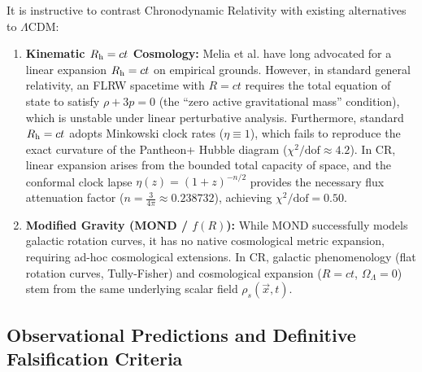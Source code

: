 \documentclass[aps,prd,reprint,superscriptaddress,nofootinbib,floatfix,amsmath,amssymb]{revtex4-2}
\begin{document}
It is instructive to contrast Chronodynamic Relativity with existing alternatives to $\Lambda\text{CDM}$:
\begin{enumerate}
    \item \textbf{Kinematic $R_{\rm h} = ct$ Cosmology:} Melia et al. \cite{Melia2012,Melia2018} have long advocated for a linear expansion $R_{\rm h} = ct$ on empirical grounds. However, in standard general relativity, an FLRW spacetime with $R = ct$ requires the total equation of state to satisfy $\rho + 3p = 0$ (the ``zero active gravitational mass'' condition), which is unstable under linear perturbative analysis. Furthermore, standard $R_{\rm h} = ct$ adopts Minkowski clock rates ($\eta \equiv 1$), which fails to reproduce the exact curvature of the Pantheon+ Hubble diagram ($\chi^2/\text{dof} \approx 4.2$). In CR, linear expansion arises from the bounded total capacity of space, and the conformal clock lapse $\eta(z) = (1+z)^{-n/2}$ provides the necessary flux attenuation factor ($n = \frac{3}{4\pi} \approx 0.238732$), achieving $\chi^2/\text{dof} = 0.50$.
    \item \textbf{Modified Gravity (MOND / $f(R)$):} While MOND successfully models galactic rotation curves, it has no native cosmological metric expansion, requiring ad-hoc cosmological extensions. In CR, galactic phenomenology (flat rotation curves, Tully-Fisher) and cosmological expansion ($R=ct$, $\Omega_\Lambda = 0$) stem from the same underlying scalar field $\rho_s(\vec{x}, t)$.
\end{enumerate}

\subsection{Observational Predictions and Definitive Falsification Criteria}
\end{document}
